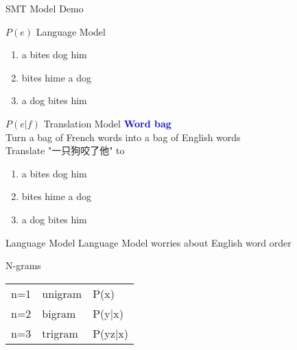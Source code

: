 \documentclass{beamer}
\begin{document}
\begin{frame}{SMT Model Demo}
    \begin{block}{$P(e)$ Language Model}
        \begin{enumerate}
            \item a bites dog him
            \item bites hime a dog
            \item a dog bites him
        \end{enumerate}
    \end{block}
    \begin{block}{$P(e|f)$ Translation Model}
        \textcolor{blue}{\textbf{Word bag}} \\
        Turn a bag of French words into a bag of English words\\
        Translate "一只狗咬了他" to 
        \begin{enumerate}
            \item a bites dog him
            \item bites hime a dog
            \item a dog bites him
        \end{enumerate}
    \end{block}
\end{frame}

\begin{frame}{Language Model}
        Language Model worries about English word order
    \begin{block}{N-grams}
        \begin{tabular}{ l  l  l}
            n=1 & unigram & P(x)\\
            n=2 & bigram  & P(y|x)\\
            n=3 & trigram & P(yz|x)
        \end{tabular}
    \end{block}

\end{frame}
\end{document}

